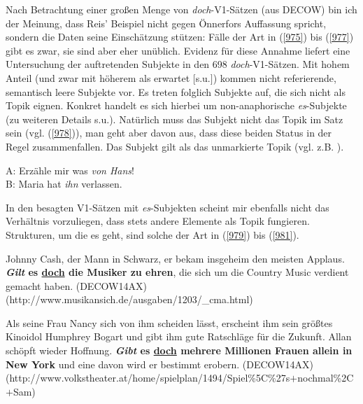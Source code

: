 {Nach Betrachtung einer großen Menge von \textit{doch}-V1-Sätzen (aus DECOW) bin ich der Meinung, dass Reis' Beispiel nicht gegen Önnerfors Auffassung spricht, sondern die Daten seine Einschätzung stützen: Fälle der Art in (\ref{975}) bis (\ref{977}) gibt es zwar, sie sind aber eher unüblich. Evidenz für diese Annahme liefert eine Untersuchung der auftretenden Subjekte in den 698 \textit{doch}-V1-Sätzen. Mit hohem Anteil (und zwar mit höherem als erwartet $[$s.u.$]$) kommen nicht referierende, semantisch leere Subjekte vor. Es treten folglich Subjekte auf, die sich nicht als Topik  eignen. Konkret handelt es sich hierbei um non-anaphorische \textit{es}-Subjekte (zu weiteren Details s.u.). Natürlich muss das Subjekt nicht das Topik im Satz sein (vgl. (\ref{978})), man geht aber davon aus, dass diese beiden Status in der Regel zusammenfallen. Das Subjekt gilt als das unmarkierte Topik (vgl. z.B. \citealt[132]{Lambrecht1994}).

\begin{exe}
	\ex\label{978}
	A: Erzähle mir was \textit{von Hans}!\\
	B: Maria hat \textit{ihn} verlassen.
\end{exe}
In den besagten V1-Sätzen mit \textit{es}-Subjekten scheint mir ebenfalls nicht das Verhältnis vorzuliegen, dass stets andere Elemente als Topik fungieren. Strukturen, um die es geht, sind solche der Art in (\ref{979}) bis (\ref{981}).

\begin{exe}
	\ex\label{979}
	\scriptsize
	Johnny Cash, der Mann in Schwarz, er bekam insgeheim den meisten Applaus. \textbf{\textit{Gilt} es \underline{doch} die Musiker zu ehren}, die sich um 		die Country Music verdient gemacht haben.
	\hfill\hbox{(DECOW14AX)}
	\newline
	\hbox{}\hfill\hbox{(http://www.musikansich.de/ausgaben/1203/\_cma.html)}
\end{exe}


\begin{exe}
	\ex\label{980}
	\scriptsize
	Als seine Frau Nancy sich von ihm scheiden lässt, erscheint ihm sein größtes Kinoidol Humphrey Bogart und gibt ihm gute Ratschläge für die Zukunft. 		Allan schöpft wieder Hoffnung. \textbf{\textit{Gibt} es \underline{doch} mehrere Millionen Frauen allein in New York} und eine davon wird er bestimmt 		erobern. 
	\newline
	\hbox{}\hfill\hbox{(DECOW14AX)}
	\newline
	\hbox{}\hfill\hbox{(http://www.volkstheater.at/home/spielplan/1494/Spiel\%5C\%27s$+$nochmal\%2C$+$Sam)}
\end{exe}							          
		   
}
